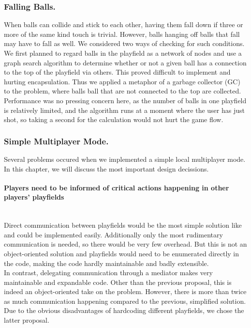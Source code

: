 \subsubsection{Falling Balls.}
\label{sec:garbage}
When balls can collide and stick to each other, having them fall down 
if three or more of the same kind touch is trivial. However, balls 
hanging off balls that fall may have to fall as well. We considered 
two ways of checking for such conditions. We first planned to regard balls in the 
playfield as a network of nodes and use a graph search algorithm to determine 
whether or not a given ball has a connection to the top of the playfield via 
others. This proved difficult to implement and hurting encapsulation. Thus 
we applied a metaphor of a garbage collector (GC) to the problem, where balls
ball that are not connected to the top are collected. Performance was no pressing 
concern here, as the number of balls in one playfield is relatively limited, 
and the algorithm runs at a moment where the user has just shot, so taking a second 
for the calculation would not hurt the game flow.

\subsubsection{Simple Multiplayer Mode.}
\label{sec:playfield}
Several problems occured when we implemented a simple local multiplayer mode. In this chapter, 
we will discuss the most important design decissions.
%
  \paragraph{Players need to be informed of critical actions happening in other players' playfields}
  ~\\
    Direct communication between playfields would be the most simple solution like and 
    could be implemented easily. Additionally only the most rudimentary communication is needed,
    so there would be very few overhead. But this is not an object-oriented solution and playfields 
    would need to be enumerated directly in the code, making the code hardly maintainable 
    and badly extensible.\\
    In contrast, delegating communication through a mediator makes very maintainable and
    expandable code. Other than the previous proposal, this is indeed an object-oriented 
    take on the problem. However, there is more than twice as much communication happening 
    compared to the previous, simplified solution. Due to the obvious disadvantages of 
    hardcoding different playfields, we chose the latter proposal.

